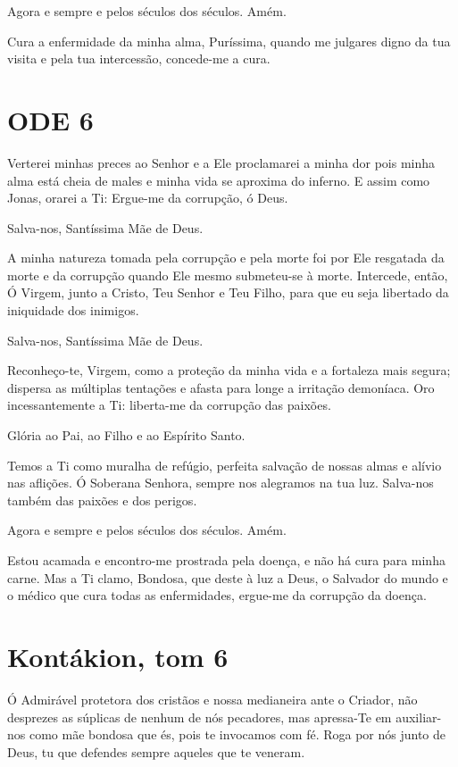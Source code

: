 \documentclass{subfiles}
\begin{document}
Agora e sempre e pelos séculos dos séculos. Amém.

Cura a enfermidade da minha alma, Puríssima, quando me julgares digno da tua
visita e pela tua intercessão, concede-me a cura.

\section{ODE 6}

\eirmos{}Verterei minhas preces ao Senhor e a Ele proclamarei a minha
dor pois minha alma está cheia de males e minha vida se aproxima do inferno.
E assim como Jonas, orarei a Ti: Ergue-me da corrupção, ó Deus.

Salva-nos, Santíssima Mãe de Deus.

A minha natureza tomada pela corrupção e pela morte foi por Ele
resgatada da morte e da corrupção quando Ele mesmo submeteu-se à morte.
Intercede, então, Ó Virgem, junto a Cristo, Teu Senhor e Teu Filho, para que eu
seja libertado da iniquidade dos inimigos.

Salva-nos, Santíssima Mãe de Deus.

Reconheço-te, Virgem, como a proteção da minha vida e a fortaleza
mais segura; dispersa as múltiplas tentações e afasta para longe a irritação
demoníaca. Oro incessantemente a Ti: liberta-me da corrupção das paixões.

Glória ao Pai, ao Filho e ao Espírito Santo.

Temos a Ti como muralha de refúgio, perfeita salvação de nossas
almas e alívio nas aflições. Ó Soberana Senhora, sempre nos alegramos na tua
luz. Salva-nos também das paixões e dos perigos.

Agora e sempre e pelos séculos dos séculos. Amém.

Estou acamada e encontro-me prostrada pela doença, e não há cura
para minha carne. Mas a Ti clamo, Bondosa, que deste à luz a Deus, o Salvador
do mundo e o médico que cura todas as enfermidades, ergue-me da corrupção
da doença.

\section{Kontákion, tom 6}

Ó Admirável protetora dos cristãos e nossa medianeira ante o Criador,
não desprezes as súplicas de nenhum de nós pecadores, mas apressa-Te em
auxiliar-nos como mãe bondosa que és, pois te invocamos com fé. Roga por
nós junto de Deus, tu que defendes sempre aqueles que te veneram.
\end{document}
